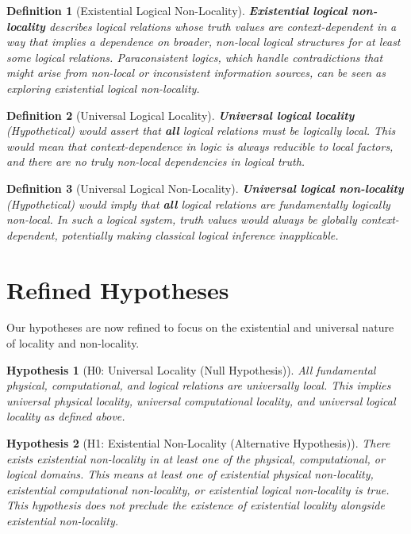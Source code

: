 \documentclass{article}
\newtheorem{definition}{Definition}
\newtheorem{hypothesis}{Hypothesis}
\begin{document}
	\begin{definition}[Existential Logical Non-Locality]
		\textbf{Existential logical non-locality} describes logical relations whose truth values are context-dependent in a way that implies a dependence on broader, non-local logical structures for at least some logical relations. Paraconsistent logics, which handle contradictions that might arise from non-local or inconsistent information sources, can be seen as exploring existential logical non-locality.
	\end{definition}
	
	\begin{definition}[Universal Logical Locality]
		\textbf{Universal logical locality} (Hypothetical) would assert that \textbf{all} logical relations must be logically local. This would mean that context-dependence in logic is always reducible to local factors, and there are no truly non-local dependencies in logical truth.
	\end{definition}
	
	\begin{definition}[Universal Logical Non-Locality]
		\textbf{Universal logical non-locality} (Hypothetical) would imply that \textbf{all} logical relations are fundamentally logically non-local. In such a logical system, truth values would always be globally context-dependent, potentially making classical logical inference inapplicable.
	\end{definition}
	
	\section{Refined Hypotheses}
	
	Our hypotheses are now refined to focus on the existential and universal nature of locality and non-locality.
	
	\begin{hypothesis}[H0: Universal Locality (Null Hypothesis)]
		All fundamental physical, computational, and logical relations are universally local.  This implies universal physical locality, universal computational locality, and universal logical locality as defined above.
	\end{hypothesis}
	
	\begin{hypothesis}[H1: Existential Non-Locality (Alternative Hypothesis)]
		There exists existential non-locality in at least one of the physical, computational, or logical domains.  This means at least one of existential physical non-locality, existential computational non-locality, or existential logical non-locality is true.  This hypothesis does not preclude the existence of existential locality alongside existential non-locality.
	\end{hypothesis}
	
\end{document}
